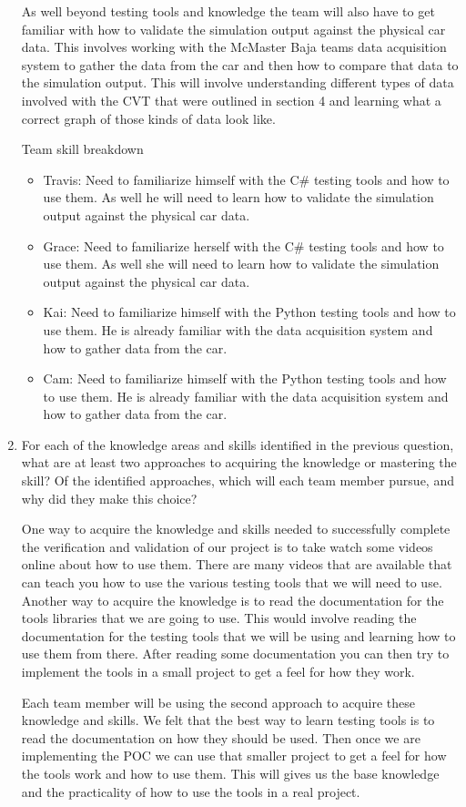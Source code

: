 \documentclass[12pt, titlepage]{article}
\begin{document}
\begin{enumerate}
  As well beyond testing tools and knowledge the team will also have to get familiar with how to validate the simulation output against the physical car data. 
  This involves working with the McMaster Baja teams data acquisition system to gather the data from the car and then how to compare that data to the simulation output.
  This will involve understanding different types of data involved with the CVT that were outlined in section 4 and learning what a correct graph of those kinds of data look like.
  
  Team skill breakdown
  \begin{itemize}
    \item Travis: Need to familiarize himself with the C\# testing tools and how to use them. As well he will need to learn how to validate the simulation output against the physical car data.
    \item Grace: Need to familiarize herself with the C\# testing tools and how to use them. As well she will need to learn how to validate the simulation output against the physical car data.
    \item Kai: Need to familiarize himself with the Python testing tools and how to use them. He is already familiar with the data acquisition system and how to gather data from the car.
    \item Cam: Need to familiarize himself with the Python testing tools and how to use them. He is already familiar with the data acquisition system and how to gather data from the car.
  \end{itemize}
  \item For each of the knowledge areas and skills identified in the previous
  question, what are at least two approaches to acquiring the knowledge or
  mastering the skill?  Of the identified approaches, which will each team
  member pursue, and why did they make this choice?

  One way to acquire the knowledge and skills needed to successfully complete the verification and validation of our project is to take watch some videos online about how to use them.
  There are many videos that are available that can teach you how to use the various testing tools that we will need to use.
  Another way to acquire the knowledge is to read the documentation for the tools libraries that we are going to use.
  This would involve reading the documentation for the testing tools that we will be using and learning how to use them from there.
  After reading some documentation you can then try to implement the tools in a small project to get a feel for how they work.

  Each team member will be using the second approach to acquire these knowledge and skills. 
  We felt that the best way to learn testing tools is to read the documentation on how they should be used.
  Then once we are implementing the POC we can use that smaller project to get a feel for how the tools work and how to use them.
  This will gives us the base knowledge and the practicality of how to use the tools in a real project.
\end{enumerate}
\end{document}
